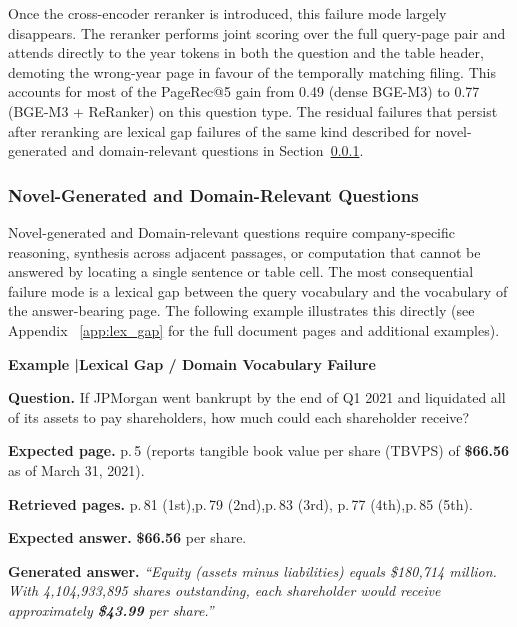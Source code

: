\documentclass[12pt,twoside,maitrise]{dms}
\newcounter{example}
\theoremstyle{definition}
\numberwithin{equation}{section}
\numberwithin{table}{chapter}
\numberwithin{figure}{chapter}
\newcounter{failex}
\newenvironment{failex}[1]{%
  \refstepcounter{failex}%
  \begin{mdframed}[
    linewidth=0.8pt,
    linecolor=black,
    innertopmargin=10pt,
    innerbottommargin=10pt,
    innerleftmargin=14pt,
    innerrightmargin=14pt,
    skipabove=\baselineskip,
    skipbelow=\baselineskip,
  ]
  \noindent\textbf{Example \thefailex\enspace|\enspace #1}
  \par\medskip
}{%
  \end{mdframed}%
}
\begin{document}
\noindent Once the cross-encoder reranker is introduced, this failure mode largely
disappears. The reranker performs joint scoring over the full query-page pair and attends
directly to the year tokens in both the question and the table header, demoting the
wrong-year page in favour of the temporally matching filing. This accounts for most of the PageRec@5 gain from 0.49 (dense BGE-M3) to 0.77 (BGE-M3 + ReRanker) on this question type.  The residual failures that persist after reranking are lexical gap failures of the same
kind described for novel-generated and domain-relevant questions in Section~\ref{sec:fail_novel}.

\subsubsection{Novel-Generated and Domain-Relevant Questions}
\label{sec:fail_novel}

Novel-generated and Domain-relevant questions require company-specific reasoning, synthesis across adjacent
passages, or computation that cannot be answered by locating a single sentence or table
cell.  The most consequential failure mode is a lexical gap between the query vocabulary
and the vocabulary of the answer-bearing page.  The following example illustrates this
directly (see Appendix ~\ref{app:lex_gap} for the full document pages and additional examples).

\begin{failex}{Lexical Gap / Domain Vocabulary Failure}
\label{ex:lexical}

\noindent\textbf{Question.}\enspace
If JPMorgan went bankrupt by the end of Q1 2021 and liquidated all of its
assets to pay shareholders, how much could each shareholder receive?

\medskip
\noindent\textbf{Expected page.}\enspace
p.\,5 (reports tangible book value per share (TBVPS) of
\textbf{\$66.56} as of March 31, 2021).

\noindent\textbf{Retrieved pages.}\enspace
p.\,81 (1st),\enspace p.\,79 (2nd),\enspace p.\,83 (3rd),\enspace
p.\,77 (4th),\enspace p.\,85 (5th).

\medskip
\noindent\textbf{Expected answer.}\enspace
\textbf{\$66.56} per share.

\medskip
\noindent\textbf{Generated answer.}\enspace
\textit{``Equity (assets minus liabilities) equals \$180{,}714 million.
With 4{,}104{,}933{,}895 shares outstanding, each shareholder would receive
approximately \textbf{\$43.99} per share.''}
\end{failex}
\vspace{1em}
\end{document}

